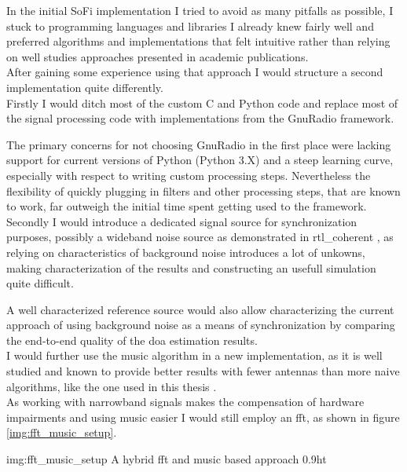 In the initial SoFi implementation I tried to avoid as many
pitfalls as possible, I stuck to programming languages and
libraries I already knew fairly well and preferred algorithms
and implementations that felt intuitive rather than relying
on well studies approaches presented in academic publications. \\

After gaining some experience using that approach I would
structure a second implementation quite differently. \\

Firstly I would ditch most of the custom C and Python code
and replace most of the signal processing code with implementations
from the GnuRadio framework.

The primary concerns for not choosing GnuRadio in the first
place were lacking support for current versions of Python
(Python 3.X) and a steep learning curve, especially with respect to writing
custom processing steps.
Nevertheless the flexibility of quickly plugging in
filters and other processing steps, that are known to work,
far outweigh the initial time spent getting used to
the framework. \\

Secondly I would introduce a dedicated signal source
for synchronization purposes, possibly a wideband noise
source as demonstrated in rtl\_coherent \cite{rtlcoherent},
as relying on characteristics of background noise
introduces a lot of unkowns, making characterization
of the results and constructing an usefull simulation
quite difficult.

A well characterized reference source would also allow
characterizing the current approach of using background
noise as a means of synchronization by comparing the end-to-end
quality of the \gls{doa} estimation results. \\

I would further use the \gls{music} algorithm in a new implementation,
as it is well studied and known to provide better results
with fewer antennas than more naive algorithms,
like the one used in this thesis \cite{vibergottersten1991}. \\

As working with narrowband signals makes the compensation
of hardware impairments and using \gls{music} easier I
would still employ an \gls{fft}, as shown in
figure \ref{img:fft_music_setup}.

             {img:fft_music_setup}
             {A hybrid \gls{fft} and \gls{music} based approach}
             {0.9}{ht}

